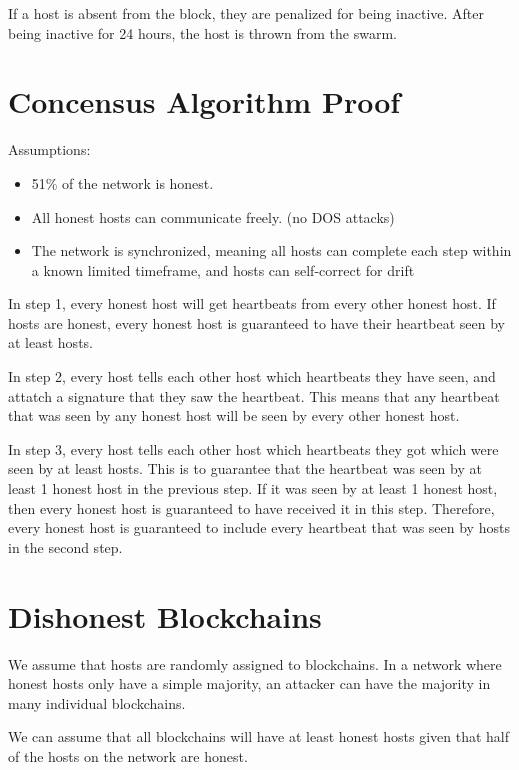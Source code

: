 \documentclass[twocolumn]{article}
\begin{document}
If a host is absent from the block, they are penalized for being inactive.
After being inactive for 24 hours, the host is thrown from the swarm.

\section{Concensus Algorithm Proof}

Assumptions:
\begin{itemize}
	\item 51\% of the network is honest.
	\item All honest hosts can communicate freely. (no DOS attacks)
	\item The network is synchronized, meaning all hosts can complete each step within a known limited timeframe, and hosts can self-correct for drift
\end{itemize}

In step 1, every honest host will get heartbeats from every other honest host.
If \fiftyone{} hosts are honest, every honest host is guaranteed to have their heartbeat seen by at least \fiftyone{} hosts.

In step 2, every host tells each other host which heartbeats they have seen, and attatch a signature that they saw the heartbeat.
This means that any heartbeat that was seen by any honest host will be seen by every other honest host.

In step 3, every host tells each other host which heartbeats they got which were seen by at least \fiftyone{} hosts.
This is to guarantee that the heartbeat was seen by at least 1 honest host in the previous step.
If it was seen by at least 1 honest host, then every honest host is guaranteed to have received it in this step.
Therefore, every honest host is guaranteed to include every heartbeat that was seen by \fiftyone{} hosts in the second step.

\section{Dishonest Blockchains}

We assume that hosts are randomly assigned to blockchains.
In a network where honest hosts only have a simple majority, an attacker can have the majority in many individual blockchains.

We can assume that all blockchains will have at least \inversemaxcorruption{} honest hosts given that half of the hosts on the network are honest.
\end{document}
